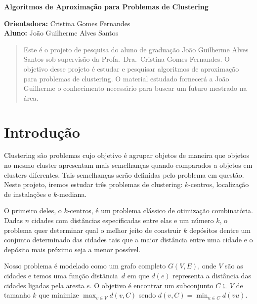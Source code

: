 \documentclass[12pt]{article}
\begin{document}
\begin{center}
  
{\Large {\bf Algoritmos de Aproximação para Problemas de Clustering}
}

\vspace{0.2cm}
{\small 
{\bf Orientadora:} Cristina Gomes Fernandes \\
{\bf Aluno:} João Guilherme Alves Santos
}

\vspace{5mm} 

\begin{abstract}
Este é o projeto de pesquisa do aluno de graduação João Guilherme Alves Santos sob supervisão da Profa.\ Dra.\ Cristina Gomes Fernandes. O objetivo desse projeto é estudar e pesquisar algoritmos de aproximação para problemas de clustering. O material estudado fornecerá a João Guilherme o conhecimento necessário para buscar um futuro mestrado na área.
\end{abstract}

\end{center}
\newpage

\tableofcontents

\newpage

\section{Introdução}

Clustering são problemas cujo objetivo é agrupar objetos de maneira que objetos no mesmo cluster apresentam mais semelhanças quando comparados a objetos em clusters diferentes. Tais semelhanças serão definidas pelo problema em questão. Neste projeto, iremos estudar três problemas de clustering: $k$-centros, localização de instalações e $k$-mediana. 



O primeiro deles, o $k$-centros, é um problema clássico de otimização combinatória. Dadas $n$ cidades com distâncias especificadas entre elas e um número $k$, o problema quer determinar qual o melhor jeito de construir $k$ depósitos dentre um conjunto determinado das cidades tais que a maior distância entre uma cidade e o depósito mais próximo seja a menor possível.

Nosso problema é modelado como um grafo completo $G(V,E)$, onde $V$ são as cidades e temos uma função distância~$d$ em que $d(e)$ representa a distância das cidades ligadas pela aresta $e$. O objetivo é encontrar um subconjunto $C \subseteq V$ de tamanho $k$ que minimize $\max_{v\in V}d(v,C)$ sendo $d(v,C) = \min_{u\in C}d(vu)$.
\end{document}
